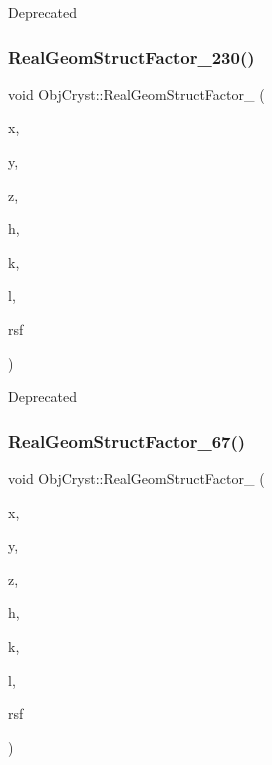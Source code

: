 \begin{DoxyRefDesc}{Deprecated}
\item[\mbox{\hyperlink{deprecated__deprecated000005}{Deprecated}}]\end{DoxyRefDesc}
\mbox{\label{namespace_obj_cryst_a7b0e5b88e8b8b47365391339b31ae08d}} 
\subsubsection{\texorpdfstring{RealGeomStructFactor\_230()}{RealGeomStructFactor\_230()}}
{\footnotesize\ttfamily void Obj\+Cryst\+::\+Real\+Geom\+Struct\+Factor\+\_ (\begin{DoxyParamCaption}\item[{const R\+E\+AL}]{x,  }\item[{const R\+E\+AL}]{y,  }\item[{const R\+E\+AL}]{z,  }\item[{const Cryst\+Vector\+\_\+\+R\+E\+AL \&}]{h,  }\item[{const Cryst\+Vector\+\_\+\+R\+E\+AL \&}]{k,  }\item[{const Cryst\+Vector\+\_\+\+R\+E\+AL \&}]{l,  }\item[{Cryst\+Vector\+\_\+\+R\+E\+AL \&}]{rsf }\end{DoxyParamCaption})}

\begin{DoxyRefDesc}{Deprecated}
\item[\mbox{\hyperlink{deprecated__deprecated000013}{Deprecated}}]\end{DoxyRefDesc}
\mbox{\label{namespace_obj_cryst_ab0dc330256ace18153a3344146e97da8}} 
\subsubsection{\texorpdfstring{RealGeomStructFactor\_67()}{RealGeomStructFactor\_67()}}
{\footnotesize\ttfamily void Obj\+Cryst\+::\+Real\+Geom\+Struct\+Factor\+\_ (\begin{DoxyParamCaption}\item[{const R\+E\+AL}]{x,  }\item[{const R\+E\+AL}]{y,  }\item[{const R\+E\+AL}]{z,  }\item[{const Cryst\+Vector\+\_\+\+R\+E\+AL \&}]{h,  }\item[{const Cryst\+Vector\+\_\+\+R\+E\+AL \&}]{k,  }\item[{const Cryst\+Vector\+\_\+\+R\+E\+AL \&}]{l,  }\item[{Cryst\+Vector\+\_\+\+R\+E\+AL \&}]{rsf }\end{DoxyParamCaption})}

